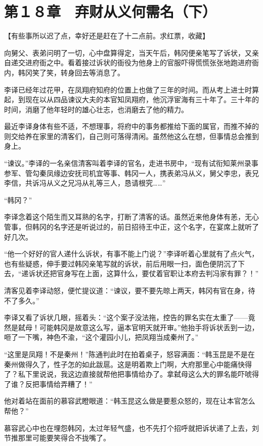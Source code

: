 \section{第１８章　弃财从义何需名（下）}

【有些事所以迟了点，幸好还是赶在了十二点前。求红票，收藏】

向舅父、表弟问明了一切，心中盘算得定，当天午后，韩冈便亲笔写了诉状，又亲自递交进府衙之中。看着接过诉状的衙役为他身上的官服吓得慌慌张张地跑进府衙内，韩冈笑了笑，转身回去等消息了。

李译已经年过花甲，在凤翔府知府的位置上也做了三年的时间。而从考上进士时算起，到现在以从四品谏议大夫的本官知凤翔府，他沉浮宦海有三十年了。三十年的时间，消磨了他年轻时的雄心壮志，也消磨去了他的精力。

最近李译身体有些不适，不想理事，将府中的事务都推给下面的属官，而推不掉的则交给养在家里的清客们，自己则可落得清闲。虽然他这么在想，但事情总会推到身上。

“谏议。”李译的一名亲信清客叫着李译的官名，走进书房中，“现有试衔知莱州录事参军、管勾秦凤缘边安抚司机宜等事、韩冈一人，携表弟冯从义，舅父李忠，表兄李信，共诉冯从义之兄冯从礼等三人，恳请根究……”

“韩冈？”

李译念着这个陌生而又耳熟的名字，打断了清客的话。虽然近来他身体有恙，无心管事，但韩冈的名字还是听说过的，前日招待王中正，这个名字，在宴席上就听了好几次。

“他一个好好的官人递什么诉状，有事不能上门说？”李译听着心里就有了点火气，也有些疑惑，伸手要过韩冈亲笔写就的诉状，前后用眼一扫，面色便阴沉了下去，“递诉状还把官身写在上面，这算什么，要仗着官职让本府去判冯家有罪？！”

清客见着李译动怒，便忙提议道：“谏议，要不要先晾上两天，韩冈有官在身，待不了多久。”

李译又看了诉状几眼，摇着头：“这个案子没法拖，控告的罪名实在太重了——竟然是弑母！可能韩冈是故意这么写，逼本官明天就开审。”他抬手将诉状丢到一边，咂了一下嘴，神色不渝，“这个灌园小儿，把凤翔当成秦州了。”

“这里是凤翔！不是秦州！”陈通判此时在拍着桌子，怒容满面：“韩玉昆是不是在秦州做得久了，性子怎的如此跋扈。这是明着欺上门啊，大府那里心中能痛快得了？私下里说说，我这边直接就帮他把事情给办了。拿弑母这么大的罪名能吓唬得了谁？反把事情给弄糟了！”

他对着站在面前的慕容武瞪眼道：“韩玉昆这么做是要惹众怒的，现在让本官怎么帮他？”

慕容武心中也在埋怨韩冈，太过年轻气盛，也不先打个招呼就把诉状递了上去，刘节推那里可能要笑得合不拢嘴了。


